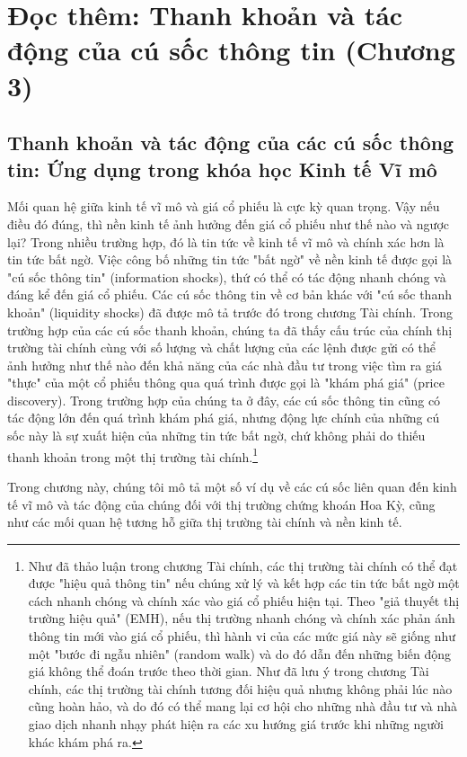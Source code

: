 \chapter{Đọc thêm: Thanh khoản và tác động của cú sốc thông tin (Chương 3)}
\label{ch:M1L2-reading}

\section{Thanh khoản và tác động của các cú sốc thông tin: Ứng dụng trong khóa học Kinh tế Vĩ mô}

Mối quan hệ giữa kinh tế vĩ mô và giá cổ phiếu là cực kỳ quan trọng. Vậy nếu điều đó đúng, thì nền kinh tế ảnh hưởng đến giá cổ phiếu như thế nào và ngược lại? Trong nhiều trường hợp, đó là tin tức về kinh tế vĩ mô và chính xác hơn là tin tức bất ngờ. Việc công bố những tin tức "bất ngờ" về nền kinh tế được gọi là "cú sốc thông tin" (information shocks), thứ có thể có tác động nhanh chóng và đáng kể đến giá cổ phiếu. Các cú sốc thông tin về cơ bản khác với "cú sốc thanh khoản" (liquidity shocks) đã được mô tả trước đó trong chương Tài chính. Trong trường hợp của các cú sốc thanh khoản, chúng ta đã thấy cấu trúc của chính thị trường tài chính cùng với số lượng và chất lượng của các lệnh được gửi có thể ảnh hưởng như thế nào đến khả năng của các nhà đầu tư trong việc tìm ra giá "thực" của một cổ phiếu thông qua quá trình được gọi là "khám phá giá" (price discovery). Trong trường hợp của chúng ta ở đây, các cú sốc thông tin cũng có tác động lớn đến quá trình khám phá giá, nhưng động lực chính của những cú sốc này là sự xuất hiện của những tin tức bất ngờ, chứ không phải do thiếu thanh khoản trong một thị trường tài chính.\footnote{Như đã thảo luận trong chương Tài chính, các thị trường tài chính có thể đạt được "hiệu quả thông tin" nếu chúng xử lý và kết hợp các tin tức bất ngờ một cách nhanh chóng và chính xác vào giá cổ phiếu hiện tại. Theo "giả thuyết thị trường hiệu quả" (EMH), nếu thị trường nhanh chóng và chính xác phản ánh thông tin mới vào giá cổ phiếu, thì hành vi của các mức giá này sẽ giống như một "bước đi ngẫu nhiên" (random walk) và do đó dẫn đến những biến động giá không thể đoán trước theo thời gian. Như đã lưu ý trong chương Tài chính, các thị trường tài chính tương đối hiệu quả nhưng không phải lúc nào cũng hoàn hảo, và do đó có thể mang lại cơ hội cho những nhà đầu tư và nhà giao dịch nhanh nhạy phát hiện ra các xu hướng giá trước khi những người khác khám phá ra.}

Trong chương này, chúng tôi mô tả một số ví dụ về các cú sốc liên quan đến kinh tế vĩ mô và tác động của chúng đối với thị trường chứng khoán Hoa Kỳ, cũng như các mối quan hệ tương hỗ giữa thị trường tài chính và nền kinh tế.

